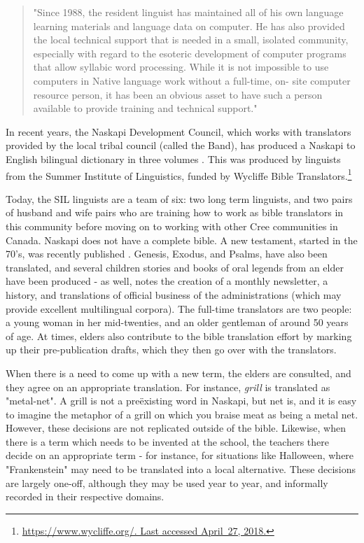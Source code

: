 \begin{quote}
"Since 1988, the resident linguist has maintained all of his own language learning materials and language data on computer. He has also provided the local technical support that is needed in a small, isolated community, especially with regard to the esoteric development of computer programs that allow syllabic word processing. While it is not impossible to use computers in Native language work without a full-time, on- site computer resource person, it has been an obvious asset to have such a person available to provide training and technical support." \citep[86]{jancewicz2002applied}
\end{quote}

In recent years, the Naskapi Development Council, which works with translators provided by the local tribal council (called the Band), has produced a Naskapi to English bilingual dictionary in three volumes \cite{MacKenzie-and-Jancewicz-1994}. This was produced by linguists from the Summer Institute of Linguistics, funded by Wycliffe Bible Translators.\footnote{\href{https://www.wycliffe.org/}{https://www.wycliffe.org/. Last accessed April~27, 2018.}}

Today, the SIL linguists are a team of six: two long term linguists, and two pairs of husband and wife pairs who are training how to work as bible translators in this community before moving on to working with other Cree communities in Canada. Naskapi does not have a complete bible. A new testament, started in the 70's, was recently published \cite{naskapi-new-testament}. Genesis, Exodus, and Psalms, have also been translated, and several children stories and books of oral legends from an elder have been produced - as well, \citet{jancewicz2002applied} notes the creation of a monthly newsletter, a history, and translations of official business of the administrations (which may provide excellent multilingual corpora). The full-time translators are two people: a young woman in her mid-twenties, and an older gentleman of around 50 years of age. At times, elders also contribute to the bible translation effort by marking up their pre-publication drafts, which they then go over with the translators.

When there is a need to come up with a new term, the elders are consulted, and they agree on an appropriate translation. For instance, {\it grill} is translated as "metal-net". A grill is not a  pre\"{e}xisting word in Naskapi, but net is, and it is easy to imagine the metaphor of a grill on which you braise meat as being a metal net. However, these decisions are not replicated outside of the bible. Likewise, when there is a term which needs to be invented at the school, the teachers there decide on an appropriate term - for instance, for situations like Halloween, where "Frankenstein" may need to be translated into a local alternative. These decisions are largely one-off, although they may be used year to year, and informally recorded in their respective domains.

